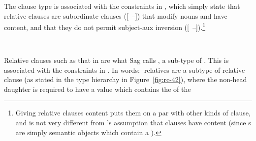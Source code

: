 \documentclass[output=paper,biblatex,babelshorthands,newtxmath,draftmode,colorlinks,citecolor=brown]{langscibook}
\begin{document}
\largerpage[2]
The  clause type is associated with the constraints in , which
simply state that relative clauses are subordinate clauses ([~{--}]) that
modify nouns and have 
content, and that they do not permit
subject-aux inversion ([~{--}]).\footnote{Giving relative clauses
   content puts them on a par with other kinds of clause, and is not
  very different from \citeauthor{Pollard:Sag:94}'s assumption that clauses have
   content (since s are simply semantic objects which contain a ).}
\begin{exe}\ex\label{x:rc-44}
 \impl\\
\end{exe}
Relative clauses such as that in  are what Sag calls
, a sub-type of . This is associated with the
constraints in . In words: -relatives are a subtype of relative clause
(as stated in the type hierarchy in Figure~\ref{fig:rc-42}), where the non-head daughter is
required to have a  value which contains the  of the
\end{document}
